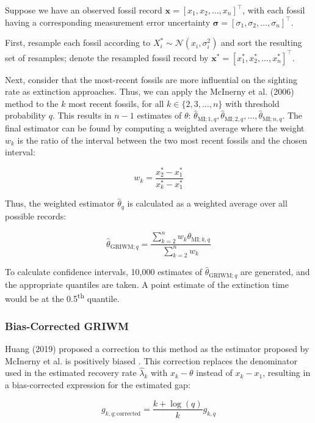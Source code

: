 Suppose we have an observed fossil record $\bm{x} = [x_1, x_2, \dots, x_n]^\top$, with each fossil having a corresponding measurement error uncertainty $\bm{\sigma}=[\sigma_1, \sigma_2, \dots, \sigma_n]^\top$.

First, resample each fossil according to $X^*_i \sim \mathcal{N}(x_i, \sigma_i^2)$ and sort the resulting set of resamples; denote the resampled fossil record by $\bm{x^*} = [x^*_1, x^*_2, \dots, x^*_n]^\top$.

Next, consider that the most-recent fossils are more influential on the sighting rate as extinction approaches. Thus, we can apply the McInerny et al. (2006) method to the $k$ most recent fossils, for all $k \in \{2, 3, \dots, n\}$ with threshold probability $q$. This results in $n-1$ estimates of $\theta$: $\hat\theta_{\text{MI}; 1, q}, \hat\theta_{\text{MI}; 2, q}, \dots, \hat\theta_{\text{MI}; n, q}$. The final estimator can be found by computing a weighted average where the weight $w_k$ is the ratio of the interval between the two most recent fossils and the chosen interval:

\[
w_k = \frac{x^*_{2} - x^*_{1}}{x^*_{k} - x^*_{1}}
\]

Thus, the weighted estimator $\hat\theta_{q}$ is calculated as a weighted average over all possible records:

\begin{equation}\label{eq:griwm1}
    \hat\theta_{\text{GRIWM}; q} = \frac{\sum_{k=2}^n w_k \hat\theta_{\text{MI}; k, q}}{\sum_{k=2}^n w_k}
\end{equation}

To calculate confidence intervals, 10,000 estimates of $\hat\theta_{\text{GRIWM}; q}$ are generated, and the appropriate quantiles are taken. A point estimate of the extinction time would be at the 0.5\textsuperscript{th} quantile.

\subsubsection{Bias-Corrected GRIWM}

Huang (2019) proposed a correction to this method as the estimator proposed by McInerny et al. is positively biased \parencite{Huang2019}. This correction replaces the denominator used in the estimated recovery rate $\hat\lambda_k$ with $x_{k} - \theta$ instead of $x_{k} - x_{1}$, resulting in a bias-corrected expression for the estimated gap:

\begin{equation}\label{eq:ub-mcinerny}
g_{k, q; \text{corrected}} = \frac{k + \log(q)}{k} g_{k, q}
\end{equation}

